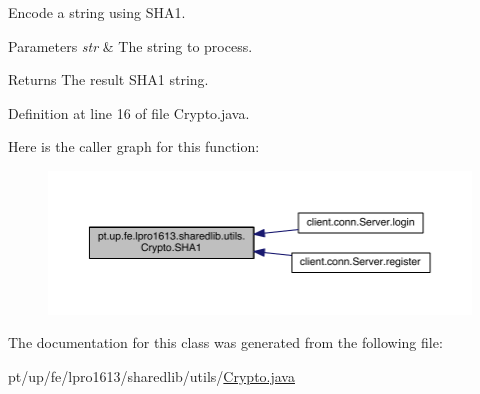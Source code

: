 Encode a string using S\+H\+A1. 
\begin{DoxyParams}{Parameters}
{\em str} & The string to process. \\
\hline
\end{DoxyParams}
\begin{DoxyReturn}{Returns}
The result S\+H\+A1 string. 
\end{DoxyReturn}


Definition at line 16 of file Crypto.\+java.

Here is the caller graph for this function\+:
\nopagebreak
\begin{figure}[H]
\begin{center}
\leavevmode
\includegraphics[width=350pt]{classpt_1_1up_1_1fe_1_1lpro1613_1_1sharedlib_1_1utils_1_1_crypto_a138c47b584355a3e915664a72a578bf9_icgraph}
\end{center}
\end{figure}


The documentation for this class was generated from the following file\+:\begin{DoxyCompactItemize}
\item 
pt/up/fe/lpro1613/sharedlib/utils/\hyperlink{_crypto_8java}{Crypto.\+java}\end{DoxyCompactItemize}
